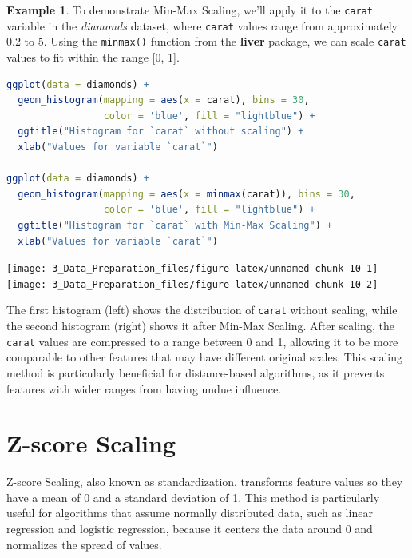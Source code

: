 \documentclass[
  11pt,
]{book}
\newcommand{\passthrough}[1]{#1}
\theoremstyle{definition}
\theoremstyle{definition}
\newtheorem{example}{Example}[chapter]
\theoremstyle{definition}
\theoremstyle{definition}
\theoremstyle{remark}
\begin{document}
\begin{example}
\protect\hypertarget{exm:ex-min-max}{}\label{exm:ex-min-max}To demonstrate Min-Max Scaling, we'll apply it to the \passthrough{\lstinline!carat!} variable in the \emph{diamonds} dataset, where \passthrough{\lstinline!carat!} values range from approximately 0.2 to 5. Using the \passthrough{\lstinline!minmax()!} function from the \textbf{liver} package, we can scale \passthrough{\lstinline!carat!} values to fit within the range {[}0, 1{]}.

\begin{lstlisting}[language=R]
ggplot(data = diamonds) +
  geom_histogram(mapping = aes(x = carat), bins = 30,
                 color = 'blue', fill = "lightblue") +
  ggtitle("Histogram for `carat` without scaling") + 
  xlab("Values for variable `carat`")

ggplot(data = diamonds) +
  geom_histogram(mapping = aes(x = minmax(carat)), bins = 30,
                 color = 'blue', fill = "lightblue") +
  ggtitle("Histogram for `carat` with Min-Max Scaling") + 
  xlab("Values for variable `carat`")
\end{lstlisting}

\texttt{[image: 3\_Data\_Preparation\_files/figure-latex/unnamed-chunk-10-1]} \texttt{[image: 3\_Data\_Preparation\_files/figure-latex/unnamed-chunk-10-2]}

The first histogram (left) shows the distribution of \passthrough{\lstinline!carat!} without scaling, while the second histogram (right) shows it after Min-Max Scaling. After scaling, the \passthrough{\lstinline!carat!} values are compressed to a range between 0 and 1, allowing it to be more comparable to other features that may have different original scales. This scaling method is particularly beneficial for distance-based algorithms, as it prevents features with wider ranges from having undue influence.
\end{example}

\section{Z-score Scaling}\label{z-score-scaling}

Z-score Scaling, also known as standardization, transforms feature values so they have a mean of 0 and a standard deviation of 1. This method is particularly useful for algorithms that assume normally distributed data, such as linear regression and logistic regression, because it centers the data around 0 and normalizes the spread of values.
\end{document}
